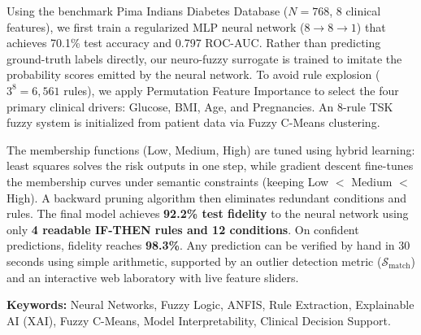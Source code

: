 \documentclass[12pt,a4paper,oneside]{report}
\makeatletter
\def\@makeschapterhead#1{%
  \vspace*{5\p@}%
  {\parindent \z@ \centering \normalfont
    \interlinepenalty\@M
    {\fontsize{15}{19}\selectfont \bfseries \MakeUppercase{#1}}\par\nobreak
    \vskip 14\p@
  }}
\makeatother
\begin{document}
Using the benchmark Pima Indians Diabetes Database ($N=768$, 8 clinical features), we first train a regularized MLP neural network ($8 \to 8 \to 1$) that achieves 70.1\% test accuracy and 0.797 ROC-AUC. Rather than predicting ground-truth labels directly, our neuro-fuzzy surrogate is trained to imitate the probability scores emitted by the neural network. To avoid rule explosion ($3^8 = 6{,}561$ rules), we apply Permutation Feature Importance to select the four primary clinical drivers: Glucose, BMI, Age, and Pregnancies. An 8-rule TSK fuzzy system is initialized from patient data via Fuzzy C-Means clustering.

The membership functions (Low, Medium, High) are tuned using hybrid learning: least squares solves the risk outputs in one step, while gradient descent fine-tunes the membership curves under semantic constraints (keeping Low $<$ Medium $<$ High). A backward pruning algorithm then eliminates redundant conditions and rules. The final model achieves \textbf{92.2\% test fidelity} to the neural network using only \textbf{4 readable IF-THEN rules and 12 conditions}. On confident predictions, fidelity reaches \textbf{98.3\%}. Any prediction can be verified by hand in 30 seconds using simple arithmetic, supported by an outlier detection metric ($\mathcal{S}_{\text{match}}$) and an interactive web laboratory with live feature sliders.

\vspace{0.35cm}
\noindent \textbf{Keywords:} Neural Networks, Fuzzy Logic, ANFIS, Rule Extraction, Explainable AI (XAI), Fuzzy C-Means, Model Interpretability, Clinical Decision Support.

\clearpage
\begingroup
\linespread{0.95}\selectfont
\small
\setlength{\parskip}{0pt}
\setcounter{tocdepth}{0}
\makeatletter
\def\@makeschapterhead#1{%
  \vspace*{2\p@}%
  {\parindent \z@ \centering \normalfont
    {\fontsize{14}{17}\selectfont \bfseries TABLE OF CONTENTS}\par\nobreak
    \vskip 10\p@
  }}
\makeatother
\tableofcontents
\endgroup

\clearpage
{}
\begingroup
\linespread{1.15}\selectfont
\setlength{\parskip}{0pt}
\makeatletter
\def\@makeschapterhead#1{%
  \vspace*{2\p@}%
  {\parindent \z@ \centering \normalfont
    {\fontsize{14}{17}\selectfont \bfseries \MakeUppercase{#1}}\par\nobreak
    \vskip 14\p@
  }}
\makeatother
\setcounter{tocdepth}{1}
\listoffigures
\endgroup
\end{document}
